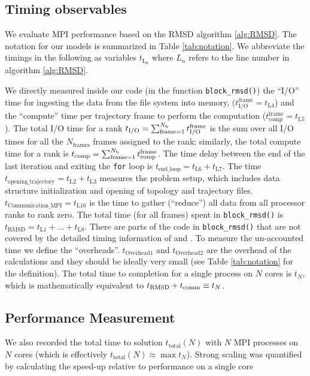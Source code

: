 \label{methods}

\subsection{Timing observables}
We evaluate MPI performance based on the RMSD algorithm \ref{alg:RMSD}. 
The notation for our models is summarized in Table \ref{tab:notation}.
We abbreviate the timings in the following as variables $t_{\text{L}_{\text{n}}}$ where $L_{n}$ refers to the line number in algorithm \ref{alg:RMSD}.

We directly measured inside our code (in the function \texttt{block\_rmsd()}) the ``I/O'' time for
ingesting the data from the file system into memory, ($t_{\text{I/O}}^{\text{frame}} = t_{\text{L4}}$) and the ``compute'' time per
trajectory frame to perform the computation ($t_{\text{comp}}^{\text{frame}} = t_{\text{L5}}$).
The total I/O time for a rank  ${t}_{\text{I/O}} = \sum_{\text{frame}=1}^{N_{\text{b}}} t_{\text{I/O}}^{\text{frame}}$ is the sum over all I/O times for all the $N_{\text{frames}}$ frames assigned to the rank; similarly, the total compute time for a rank is ${t}_{\text{comp}} = \sum_{\text{frame}=1}^{N_{\text{b}}} t_{\text{comp}}^{\text{frame}}$. 
The time delay between the end of the last iteration and exiting the \texttt{for} loop is $t_{\text{end\_loop}} = t_{\text{L6}}+t_{\text{L7}}$.
The time $t_{\text{opening\_trajectory}} = t_{\text{L2}}+t_{\text{L3}}$ measures the problem setup, which includes data structure initialization and opening of topology and trajectory files.
$t_{\text{Communication\_{MPI}}} = t_{\text{L16}}$ is the time to gather (``reduce'') all data from all processor ranks to rank zero.
The total time (for all frames) spent in \texttt{block\_rmsd()} is $t_{\text{RMSD}} = t_{\text{L1}} + ...+ t_{\text{L8}}$. 
There are parts of the code in \texttt{block\_rmsd()} that are not covered by the detailed timing information of \tcomp and \tIO. 
To measure the un-accounted time we define the ``overheads''.
$t_{\text{Overhead1}}$ and $t_{\text{Overhead2}}$ are the overhead of the calculations and they should be ideally very small (see Table \ref{tab:notation} for the definition).  
The total time to completion for a single process on $N$ cores is $t_{N}$, which is mathematically equivalent to
$ t_{\text{RMSD}} + t_{\text{comm}} \equiv t_{N}$.

\subsection{Performance Measurement}
We also recorded the total time to solution $t_{\text{total}}(N)$ with $N$ MPI processes on $N$ cores (which is effectively
$t_{\text{total}}(N) \approx \max t_{N}$). 
Strong scaling was quantified by calculating the speed-up relative to performance on a single core

